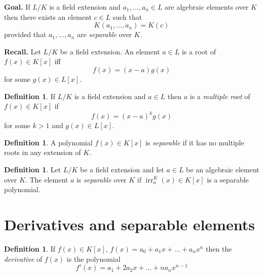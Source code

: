 \documentclass[12pt, letterpaper, oneside]{article}
\theoremstyle{plain}
\theoremstyle{definition}
\newtheorem{definition}[theorem]{Definition}
\newcommand{\irr}{\operatorname{irr}}
\newcommand{\vs}{\vskip 5mm}
\begin{document}
\vs\vs


\textbf{Goal.} If $L/K$ is a field extension and $a_{1}, \dots, a_{n}\in L$ are algebraic elements 
over $K$ then there exists an element $c\in L$ such that 
$$K(a_{1}, \dots, a_{n}) = K(c)$$
provided that $a_{1}, \dots, a_{n}$ are \emph{separable} over $K$.


\vs\vs


\textbf{Recall.} Let $L/K$ be a field extension. An element $a\in L$ 
is a root of  $f(x)\in K[x]$ iff 
$$f(x) = (x-a)g(x)$$ 
for some $g(x)\in L[x]$.


\vs\vs

\begin{definition}
If $L/K$ is a field extension and $a\in L$ then $a$ is a \emph{multiple root} of $f(x)\in K[x]$
if 
$$f(x) = (x-a)^{k}g(x)$$
for some $k>1$ and $g(x)\in L[x]$. 
\end{definition}


\vs\vs

\begin{definition}
A polynomial $f(x)\in K[x]$ is \emph{separable} if it has no multiple roots in any 
extension of $K$.
\end{definition}

\vs\vs

\begin{definition}
Let $L/K$ be a field extension and let $a\in L$ be an algebraic element over $K$. 
The element $a$ is \emph{separable} over $K$ if $\irr^{K}_{a}(x) \in K[x]$ is a separable 
polynomial.   
\end{definition}











\newpage
\section{Derivatives and separable elements}
\label{SEC_DERIVANDSEPELTS}

\begin{definition}
If $f(x)\in K[x]$, $f(x) = a_{0}+ a_{1}x + {\dots} + a_{n}x^{n}$
then the \emph{derivative} of $f(x)$ is the polynomial 
$$f'(x) = a_{1} + 2a_{2}x + {\dots} + na_{n}x^{n-1}$$
\end{definition}
\end{document}
